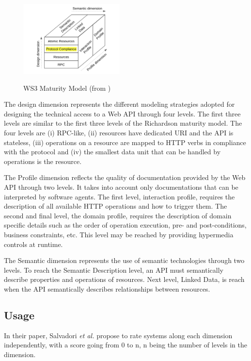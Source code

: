 \begin{figure}[ht]
  \caption{WS3 Maturity Model (from \cite{7195633})}
  \centering
  \includegraphics[width=0.47\textwidth]{figures/ws3-maturity-model.png}
  \label{WS3}
\end{figure}

The design dimension represents the different modeling strategies adopted for designing the technical access to a Web API through four levels. The first three levels are similar to the first three levels of the Richardson maturity model. The four levels are (i) RPC-like, (ii) resources have dedicated URI and the API is stateless, (iii) operations on a resource are mapped to HTTP verbs in compliance with the protocol and (iv) the smallest data unit that can be handled by operations is the resource.

The Profile dimension reflects the quality of documentation provided by the Web API through two levels. It takes into account only documentations that can be interpreted by software agents. The first level, interaction profile, requires the description of all available HTTP operations and how to trigger them. The second and final level, the domain profile, requires the description of domain specific details such as the order of operation execution, pre- and post-conditions, business constraints, etc. This level may be reached by providing hypermedia controls at runtime.

The Semantic dimension represents the use of semantic technologies through two levels. To reach the Semantic Description level, an API must semantically describe properties and operations of resources. Next level, Linked Data, is reach when the API semantically describes relationships between resources.

\subsection{Usage}

In their paper, Salvadori \emph{et al.} propose to rate systems along each dimension independently, with a score going from 0 to n, n being the number of levels in the dimension.

